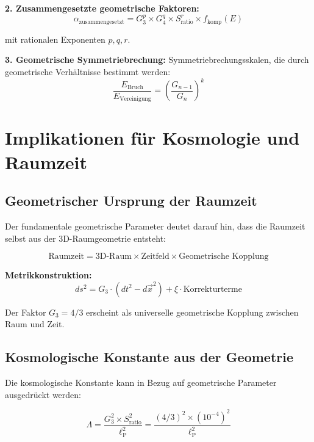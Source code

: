 \documentclass[12pt,a4paper]{report}
\newcommand{\lP}{\ell_{\text{P}}}         %
\begin{document}
	\textbf{2. Zusammengesetzte geometrische Faktoren:}
	\begin{equation}
		\alpha_{\text{zusammengesetzt}} = G_3^p \times G_4^q \times S_{\text{ratio}}^r \times f_{\text{komp}}(E)
	\end{equation}
	
	mit rationalen Exponenten $p, q, r$.
	
	\textbf{3. Geometrische Symmetriebrechung:}
	Symmetriebrechungsskalen, die durch geometrische Verhältnisse bestimmt werden:
	\begin{equation}
		\frac{E_{\text{Bruch}}}{E_{\text{Vereinigung}}} = \left(\frac{G_{n-1}}{G_n}\right)^k
	\end{equation}
	
	\section{Implikationen für Kosmologie und Raumzeit}
	\label{sec:cosmology_spacetime}
	
	\subsection{Geometrischer Ursprung der Raumzeit}
	\label{subsec:geometric_origin_spacetime}
	
	Der fundamentale geometrische Parameter deutet darauf hin, dass die Raumzeit selbst aus der 3D-Raumgeometrie entsteht:
	
	\begin{equation}
		\text{Raumzeit} = \text{3D-Raum} \times \text{Zeitfeld} \times \text{Geometrische Kopplung}
	\end{equation}
	
	\textbf{Metrikkonstruktion:}
	\begin{equation}
		ds^2 = G_3 \cdot \left(dt^2 - d\vec{x}^2\right) + \xi \cdot \text{Korrekturterme}
	\end{equation}
	
	Der Faktor $G_3 = 4/3$ erscheint als universelle geometrische Kopplung zwischen Raum und Zeit.
	
	\subsection{Kosmologische Konstante aus der Geometrie}
	\label{subsec:cosmological_constant}
	
	Die kosmologische Konstante kann in Bezug auf geometrische Parameter ausgedrückt werden:
	
	\begin{equation}
		\Lambda = \frac{G_3^2 \times S_{\text{ratio}}^2}{\lP^2} = \frac{(4/3)^2 \times (10^{-4})^2}{\lP^2}
	\end{equation}
	
\end{document}
